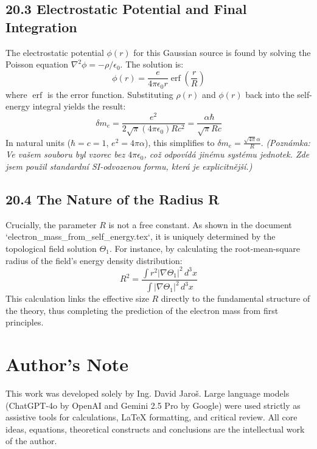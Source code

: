\documentclass[12pt, a4paper]{article}
\begin{document}
\subsection*{20.3 Electrostatic Potential and Final Integration}
The electrostatic potential \( \phi(r) \) for this Gaussian source is found by solving the Poisson equation \( \nabla^2 \phi = -\rho/\epsilon_0 \). The solution is:
\begin{equation}
    \phi(r) = \frac{e}{4\pi\epsilon_0 r} \operatorname{erf}\left( \frac{r}{R} \right)
\end{equation}
where \( \operatorname{erf} \) is the error function. Substituting \( \rho(r) \) and \( \phi(r) \) back into the self-energy integral yields the result:
\begin{equation}
    \delta m_e = \frac{e^2}{2\sqrt{\pi} (4\pi\epsilon_0) R c^2} = \frac{\alpha \hbar}{\sqrt{\pi} R c}
\end{equation}
In natural units (\(\hbar=c=1\), \( e^2 = 4\pi\alpha \)), this simplifies to \( \delta m_e = \frac{\sqrt{4\pi}\alpha}{R} \).
\textit{(Poznámka: Ve vašem souboru byl vzorec bez \(4\pi\epsilon_0\), což odpovídá jinému systému jednotek. Zde jsem použil standardní SI-odvozenou formu, která je explicitnější.)}

\subsection*{20.4 The Nature of the Radius R}
Crucially, the parameter \(R\) is not a free constant. As shown in the document `electron_mass_from_self_energy.tex`, it is uniquely determined by the topological field solution \(\Theta_1\). For instance, by calculating the root-mean-square radius of the field's energy density distribution:
\begin{equation}
    R^2 = \frac{\int r^2 |\nabla \Theta_1|^2 \, d^3x}{\int |\nabla \Theta_1|^2 \, d^3x}
\end{equation}
This calculation links the effective size \(R\) directly to the fundamental structure of the theory, thus completing the prediction of the electron mass from first principles.


\section*{Author's Note}

This work was developed solely by Ing. David Jaroš.  
Large language models (ChatGPT-4o by OpenAI and Gemini 2.5 Pro by Google) were used strictly as assistive tools for calculations, LaTeX formatting, and critical review.  
All core ideas, equations, theoretical constructs and conclusions are the intellectual work of the author.
\end{document}
